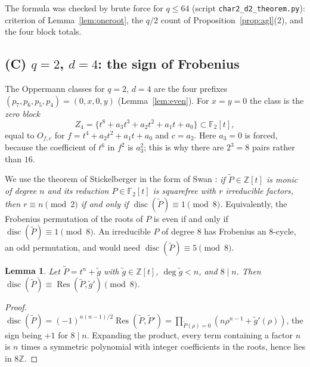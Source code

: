 \documentclass[11pt,a4paper]{amsart}
\newtheorem{lemma}[theorem]{Lemma}
\theoremstyle{definition}
\theoremstyle{remark}
\newcommand{\F}{\mathbb{F}}
\newcommand{\Z}{\mathbb{Z}}
\newcommand{\disc}{\operatorname{disc}}
\newcommand{\Res}{\operatorname{Res}}
\begin{document}
The formula was checked by brute force for $q\le64$ (script \texttt{char2\_d2\_theorem.py}): criterion of
Lemma~\ref{lem:oneroot}, the $q/2$ count of Proposition~\ref{prop:agl}(2), and the four block totals.

\subsection{\texorpdfstring{(C) $q=2$, $d=4$: the sign of Frobenius}{(C) q=2, d=4: the sign of Frobenius}}

The Oppermann classes for $q=2$, $d=4$ are the four prefixes $(p_7,p_6,p_5,p_4)=(0,x,0,y)$ (Lemma~\ref{lem:even}).
For $x=y=0$ the class is the \emph{zero block}
\[
Z_4=\{t^8+a_3t^3+a_2t^2+a_1t+a_0\}\subset\F_2[t],
\]
equal to $O_{f,c}$ for $f=t^4+a_2t^2+a_1t+a_0$ and $c=a_2$. Here $a_3=0$ is forced, because the coefficient of
$t^6$ in $f^2$ is $a_3^2$; this is why there are $2^3=8$ pairs rather than $16$.

We use the theorem of Stickelberger \cite{Stickelberger} in the form of Swan \cite[Cor.~1]{Swan}: \emph{if
$\tilde P\in\Z[t]$ is monic of degree $n$ and its reduction $P\in\F_2[t]$ is squarefree with $r$ irreducible
factors, then $r\equiv n\pmod2$ if and only if $\disc(\tilde P)\equiv1\pmod8$.} Equivalently, the Frobenius
permutation of the roots of $P$ is even if and only if $\disc(\tilde P)\equiv1\pmod 8$. An irreducible $P$ of degree $8$
has Frobenius an $8$-cycle, an odd permutation, and would need $\disc(\tilde P)\equiv5\pmod8$.

\begin{lemma}\label{lem:tail}
Let $\tilde P=t^n+\tilde g$ with $\tilde g\in\Z[t]$, $\deg\tilde g<n$, and $8\mid n$. Then
$\disc(\tilde P)\equiv\Res(\tilde P,\tilde g')\pmod8$.
\end{lemma}

\begin{proof}
$\disc(\tilde P)=(-1)^{n(n-1)/2}\Res(\tilde P,\tilde P')=\prod_{\tilde P(\rho)=0}(n\rho^{n-1}+\tilde g'(\rho))$, the
sign being $+1$ for $8\mid n$. Expanding the product, every term containing a factor $n$ is $n$ times a symmetric
polynomial with integer coefficients in the roots, hence lies in $8\Z$.
\end{proof}
\end{document}
